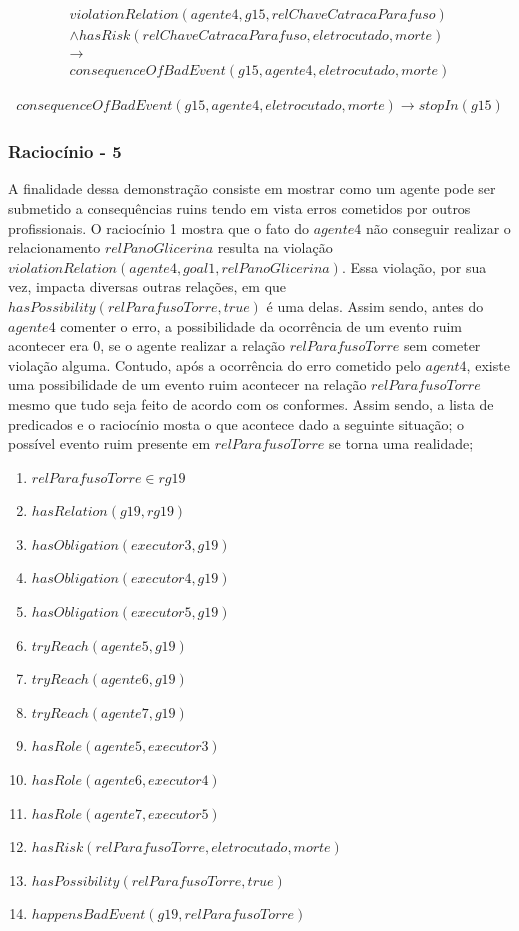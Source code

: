 \documentclass[12pt]{article}
\begin{document}
\begin{eqnarray}\nonumber
	violationRelation(agente4,g15,relChaveCatracaParafuso) \nonumber \\ 
	 \wedge hasRisk(relChaveCatracaParafuso,eletrocutado,morte) \nonumber \\ 
	\to \nonumber \\ 
	consequenceOfBadEvent(g15,agente4,eletrocutado,morte)
\end{eqnarray}

\begin{eqnarray}
	consequenceOfBadEvent(g15,agente4,eletrocutado,morte) \to stopIn(g15)
\end{eqnarray}

\subsubsection{Raciocínio - 5} 

A finalidade dessa demonstração consiste em mostrar como um agente pode ser submetido a consequências ruins tendo em vista erros cometidos por outros profissionais. O raciocínio 1 mostra que o fato do $agente4$ não conseguir realizar o relacionamento $relPanoGlicerina$ resulta na violação $violationRelation(agente4,goal1,relPanoGlicerina)$. Essa violação, por sua vez, impacta diversas outras relações, em que $hasPossibility(relParafusoTorre,true)$ é uma delas. Assim sendo, antes do $agente4$ comenter o erro, a possibilidade da ocorrência de um evento ruim acontecer era 0, se o agente realizar a relação $relParafusoTorre$ sem cometer violação alguma. Contudo, após a ocorrência do erro cometido pelo $agent4$, existe uma possibilidade de um evento ruim acontecer na relação $relParafusoTorre$ mesmo que tudo seja feito de acordo com os conformes. Assim sendo, a lista de predicados e o raciocínio mosta o que acontece dado a seguinte situação; o possível evento ruim presente em $relParafusoTorre$ se torna uma realidade;  

\begin{enumerate}
	\item $relParafusoTorre \in rg19$	
	\item $hasRelation(g19,rg19)$		
	\item $hasObligation(executor3,g19)$
	\item $hasObligation(executor4,g19)$
	\item $hasObligation(executor5,g19)$		
	\item $tryReach(agente5,g19)$
	\item $tryReach(agente6,g19)$
	\item $tryReach(agente7,g19)$									
	\item $hasRole(agente5,executor3)$
	\item $hasRole(agente6,executor4)$
	\item $hasRole(agente7,executor5)$
	\item $hasRisk(relParafusoTorre,eletrocutado,morte)$
	\item $hasPossibility(relParafusoTorre,true)$
	\item $happensBadEvent(g19,relParafusoTorre)$	
\end{enumerate}
\end{document}

